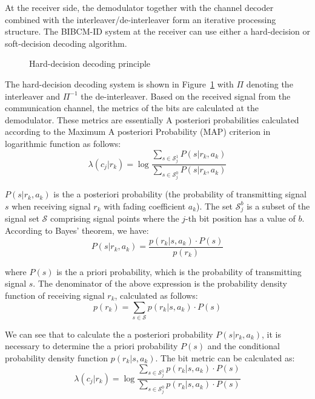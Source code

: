 \documentclass[a4paper,14pt]{extreport}
\begin{document}
At the receiver side, the demodulator together with the channel decoder combined with the interleaver/de-interleaver form an iterative processing structure. The BIBCM-ID system at the receiver can use either a hard-decision or soft-decision decoding algorithm.

\begin{figure}[H]
    \centering
    \caption{Hard-decision decoding principle}
    \label{fig:hard_decision}
\end{figure}

The hard-decision decoding system is shown in Figure~\ref{fig:hard_decision} with $\Pi$ denoting the interleaver and $\Pi^{-1}$ the de-interleaver. Based on the received signal from the communication channel, the metrics of the bits are calculated at the demodulator. These metrics are essentially A posteriori probabilities calculated according to the Maximum A posteriori Probability (MAP) criterion in logarithmic function as follows:
\begin{equation}
    \lambda(c_j | r_k) = \log\frac{\sum_{s \in \mathcal{S}_j^1} P(s|r_k, a_k)}{\sum_{s \in \mathcal{S}_j^0} P(s|r_k, a_k)}
    \label{eq:bit_metric}
\end{equation}

$P(s|r_k, a_k)$ is the a posteriori probability (the probability of transmitting signal $s$ when receiving signal $r_k$ with fading coefficient $a_k$). The set $\mathcal{S}_j^b$ is a subset of the signal set $\mathcal{S}$ comprising signal points where the $j$-th bit position has a value of $b$. According to Bayes' theorem, we have:
\begin{equation}
    P(s|r_k, a_k) = \frac{p(r_k|s, a_k) \cdot P(s)}{p(r_k)}
    \label{eq:bayes}
\end{equation}

where $P(s)$ is the a priori probability, which is the probability of transmitting signal $s$. The denominator of the above expression is the probability density function of receiving signal $r_k$, calculated as follows:
\begin{equation}
    p(r_k) = \sum_{s \in \mathcal{S}} p(r_k|s, a_k) \cdot P(s)
    \label{eq:pdf_rk}
\end{equation}

We can see that to calculate the a posteriori probability $P(s|r_k, a_k)$, it is necessary to determine the a priori probability $P(s)$ and the conditional probability density function $p(r_k|s, a_k)$. The bit metric can be calculated as:
\begin{equation}
    \lambda(c_j | r_k) = \log\frac{\sum_{s \in \mathcal{S}_j^1} p(r_k|s, a_k) \cdot P(s)}{\sum_{s \in \mathcal{S}_j^0} p(r_k|s, a_k) \cdot P(s)}
    \label{eq:bit_metric_full}
\end{equation}
\end{document}
